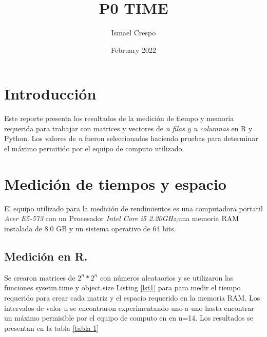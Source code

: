 \documentclass{article}
\title{P0 TIME}
\author{Ismael Crespo}
\date{February 2022}
\begin{document}
\maketitle

\section{Introducción}
Este reporte presenta los resultados de la medición de tiempo y memoria requerida para trabajar con matrices y vectores de \emph{n filas y n columnas} en R y Python. Los valores de \emph{n} fueron seleccionados haciendo pruebas para determinar el máximo permitido por el equipo de computo utilizado. 

\section{Medición de tiempos y espacio }
El equipo utilizado para la medición de rendimientos es una computadora portatil \emph{Acer E5-573 } con un Procesador \emph{Intel Core i5 2.20GHz},una memoria RAM instalada de 8.0 GB y un sistema operativo de 64 bits.
\subsection{Medición en R.} 
Se crearon matrices de $2^n * 2^n$ con números aleataorios y se utilizaron las funciones sysetm.time y object.size Listing \ref{lst1} para para medir el tiempo requerido para crear cada matriz y el espacio requerido en la memoria RAM. Los intervalos de valor n se encontraron experimentando uno a uno hasta encontrar un máximo permisible por el equipo de computo en en n=14. Los resultados se presentan en la tabla \ref{tabla 1}
\end{document}
